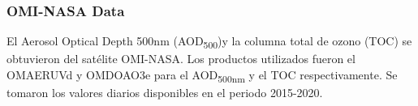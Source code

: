 \subsubsection{OMI-NASA Data}
El Aerosol Optical Depth 500nm (AOD\textsubscript{500})y la columna total de ozono (TOC) se obtuvieron del satélite OMI-NASA. Los productos utilizados fueron el OMAERUVd \cite{OMI_AOD} y OMDOAO3e \cite{OMI_ozone} para el AOD\textsubscript{500nm} y el TOC respectivamente. Se tomaron los valores diarios disponibles en el periodo 2015-2020.